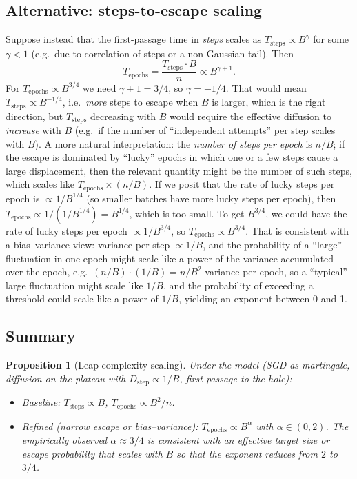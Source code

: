 \documentclass[11pt]{article}
\newtheorem{proposition}{Proposition}
\begin{document}
\subsection{Alternative: steps-to-escape scaling}

Suppose instead that the first-passage time in \emph{steps} scales as $T_{\mathrm{steps}} \propto B^\gamma$ for some $\gamma < 1$ (e.g.\ due to correlation of steps or a non-Gaussian tail). Then
\begin{equation}
T_{\mathrm{epochs}} = \frac{T_{\mathrm{steps}} \cdot B}{n} \propto B^{\gamma + 1}.
\end{equation}
For $T_{\mathrm{epochs}} \propto B^{3/4}$ we need $\gamma + 1 = 3/4$, so $\gamma = -1/4$. That would mean $T_{\mathrm{steps}} \propto B^{-1/4}$, i.e.\ \emph{more} steps to escape when $B$ is larger, which is the right direction, but $T_{\mathrm{steps}}$ decreasing with $B$ would require the effective diffusion to \emph{increase} with $B$ (e.g.\ if the number of ``independent attempts'' per step scales with $B$). A more natural interpretation: the \emph{number of steps per epoch} is $n/B$; if the escape is dominated by ``lucky'' epochs in which one or a few steps cause a large displacement, then the relevant quantity might be the number of such steps, which scales like $T_{\mathrm{epochs}} \times (n/B)$. If we posit that the rate of lucky steps per epoch is $\propto 1/B^{1/4}$ (so smaller batches have more lucky steps per epoch), then $T_{\mathrm{epochs}} \propto 1 / (1/B^{1/4}) = B^{1/4}$, which is too small. To get $B^{3/4}$, we could have the rate of lucky steps per epoch $\propto 1/B^{3/4}$, so $T_{\mathrm{epochs}} \propto B^{3/4}$. That is consistent with a bias--variance view: variance per step $\propto 1/B$, and the probability of a ``large'' fluctuation in one epoch might scale like a power of the variance accumulated over the epoch, e.g.\ $(n/B) \cdot (1/B) = n/B^2$ variance per epoch, so a ``typical'' large fluctuation might scale like $1/B$, and the probability of exceeding a threshold could scale like a power of $1/B$, yielding an exponent between 0 and 1.

\subsection{Summary}

\begin{proposition}[Leap complexity scaling]
Under the model (SGD as martingale, diffusion on the plateau with $D_{\mathrm{step}} \propto 1/B$, first passage to the hole):
\begin{itemize}
\item Baseline: $T_{\mathrm{steps}} \propto B$, $T_{\mathrm{epochs}} \propto B^2/n$.
\item Refined (narrow escape or bias--variance): $T_{\mathrm{epochs}} \propto B^\alpha$ with $\alpha \in (0, 2)$. The empirically observed $\alpha \approx 3/4$ is consistent with an effective target size or escape probability that scales with $B$ so that the exponent reduces from $2$ to $3/4$.
\end{itemize}
\end{proposition}
\end{document}
